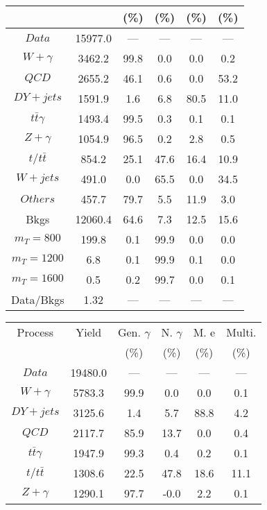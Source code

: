 \begin{figure}
\begin{minipage}[c]{0.32\textwidth}
{\begin{tabular}{cccccc}
 &  & (\%) & (\%) & (\%) & (\%)  \\
\hline
                                                                      $ Data $ &  15977.0 &  --- &  --- &  --- &  ---\\
$ W+\gamma $ &  3462.2 &  99.8 &  0.0 &  0.0 &  0.2\\
$ QCD $ &  2655.2 &  46.1 &  0.6 &  0.0 &  53.2\\
$ DY+jets $ &  1591.9 &  1.6 &  6.8 &  80.5 &  11.0\\
$ t\bar{t}\gamma $ &  1493.4 &  99.5 &  0.3 &  0.1 &  0.1\\
$ Z+\gamma $ &  1054.9 &  96.5 &  0.2 &  2.8 &  0.5\\
$ t/t\bar{t} $ &  854.2 &  25.1 &  47.6 &  16.4 &  10.9\\
$ W+jets $ &  491.0 &  0.0 &  65.5 &  0.0 &  34.5\\
$ Others $ &  457.7 &  79.7 &  5.5 &  11.9 &  3.0\\
Bkgs &  12060.4 &  64.6 &  7.3 &  12.5 &  15.6\\
$ m_{T} = 800 $ &  199.8 &  0.1 &  99.9 &  0.0 &  0.0\\
$ m_{T} = 1200 $ &  6.8 &  0.1 &  99.9 &  0.1 &  0.0\\
$ m_{T} = 1600 $ &  0.5 &  0.2 &  99.7 &  0.0 &  0.1\\
Data/Bkgs &  1.32 &  --- &  --- &  --- &  ---\\
\hline
\end{tabular}
}
\end{minipage}
\begin{minipage}[c]{0.32\textwidth}
\centering
\tiny{
\begin{tabular}{cccccc}
\hline
Process & Yield & Gen. $\gamma$ & N. $\gamma$ & M. e & Multi. \\
 &  & (\%) & (\%) & (\%) & (\%)  \\
\hline
                                                                      $ Data $ &  19480.0 &  --- &  --- &  --- &  ---\\
$ W+\gamma $ &  5783.3 &  99.9 &  0.0 &  0.0 &  0.1\\
$ DY+jets $ &  3125.6 &  1.4 &  5.7 &  88.8 &  4.2\\
$ QCD $ &  2117.7 &  85.9 &  13.7 &  0.0 &  0.4\\
$ t\bar{t}\gamma $ &  1947.9 &  99.3 &  0.4 &  0.2 &  0.1\\
$ t/t\bar{t} $ &  1308.6 &  22.5 &  47.8 &  18.6 &  11.1\\
$ Z+\gamma $ &  1290.1 &  97.7 &  -0.0 &  2.2 &  0.1\\

\end{tabular}}
\end{minipage}
\end{figure}
